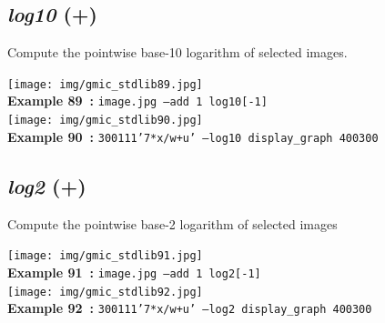 \documentclass[a4paper,10.5pt,twoside]{book}
\def\comma{\discretionary{,}{}{,}}
\begin{document}
\subsection{\emph{log10} (+)}\vspace*{-0.7em}
Compute the pointwise base-10 logarithm of selected images.
\begin{center}\texttt{[image: img/gmic\_stdlib89.jpg]}\\
{\footnotesize \textbf{Example 89~:} \texttt{image.jpg --add 1 log10[-1]}}
\\\texttt{[image: img/gmic\_stdlib90.jpg]}\\
{\footnotesize \textbf{Example 90~:} \texttt{300{\comma}1{\comma}1{\comma}1{\comma}'7*x/w+u' --log10 display\_graph 400{\comma}300}}
\end{center}

\subsection{\emph{log2} (+)}\vspace*{-0.7em}
Compute the pointwise base-2 logarithm of selected images
\begin{center}\texttt{[image: img/gmic\_stdlib91.jpg]}\\
{\footnotesize \textbf{Example 91~:} \texttt{image.jpg --add 1 log2[-1]}}
\\\texttt{[image: img/gmic\_stdlib92.jpg]}\\
{\footnotesize \textbf{Example 92~:} \texttt{300{\comma}1{\comma}1{\comma}1{\comma}'7*x/w+u' --log2 display\_graph 400{\comma}300}}
\end{center}
\end{document}
